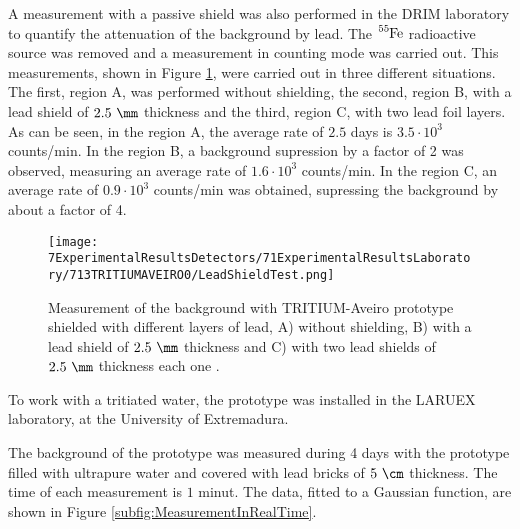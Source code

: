 A measurement with a passive shield was also performed in the DRIM laboratory to quantify the attenuation of the background by lead. The $\ce{^{55}Fe}$ radioactive source was removed and a measurement in counting mode was carried out. This measurements, shown in Figure \ref{fig:LeadShieldTest}, were carried out in three different situations. The first, region A, was performed without shielding, the second, region B, with a lead shield of $2.5~\mm$ thickness and the third, region C, with two lead foil layers. As can be seen, in the region A, the average rate of $2.5$ days is $3.5 \cdot{} 10^3$ counts/min. In the region B, a background supression by a factor of 2 was observed, measuring an average rate of $1.6 \cdot{} 10^3$ counts/min. In the region C, an average rate of $0.9 \cdot{} 10^3$ counts/min was obtained, supressing the background by about a factor of 4.

\begin{figure}[h]
\centering
\texttt{[image: 7ExperimentalResultsDetectors/71ExperimentalResultsLaboratory/713TRITIUMAVEIRO0/LeadShieldTest.png]}
\caption{Measurement of the background with TRITIUM-Aveiro prototype shielded with different layers of lead, A) without shielding, B) with a lead shield of $2.5~\mm$ thickness and C) with two lead shields of $2.5~\mm$ thickness each one \cite{ExperimentalPaperCarlos}.\label{fig:LeadShieldTest}}
\end{figure}


To work with a tritiated water, the prototype was installed in the LARUEX laboratory, at the University of Extremadura. 

The background of the prototype was measured during 4 days with the prototype filled with ultrapure water and covered with lead bricks of $5~\cm$ thickness. The time of each measurement is $1$ minut. The data, fitted to a Gaussian function, are shown in Figure \ref{subfig:MeasurementInRealTime}. 

